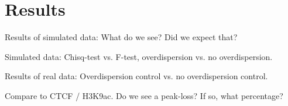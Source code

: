 \section{Results}

Results of simulated data: What do we see? Did we expect that?

Simulated data: Chisq-test vs. F-test, overdispersion vs. no overdispersion.

Results of real data: Overdispersion control vs. no overdispersion control.

Compare to CTCF / H3K9ac. Do we see a peak-loss? If so, what percentage?
  
  
  